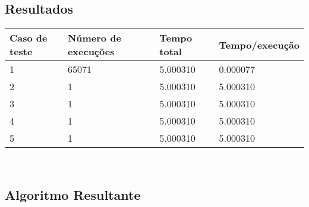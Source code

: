 \documentclass[12pt]{article}
\begin{document}
\subsection{ Resultados }
\begin{tabular}{llll}
  \toprule
  \textbf{Caso de teste}  &  \textbf{Número de execuções} &   \textbf{Tempo total} &  \textbf{Tempo/execução} \\
  \midrule
1 & 65071  & 5.000310 & 0.000077 \\
2 & 1  & 5.000310 & 5.000310 \\
3 & 1  & 5.000310 & 5.000310 \\
4 & 1  & 5.000310 & 5.000310 \\
5 & 1  & 5.000310 & 5.000310 \\

  \bottomrule 
\end{tabular}\\

\subsection{ Algoritmo Resultante }
\end{document}
